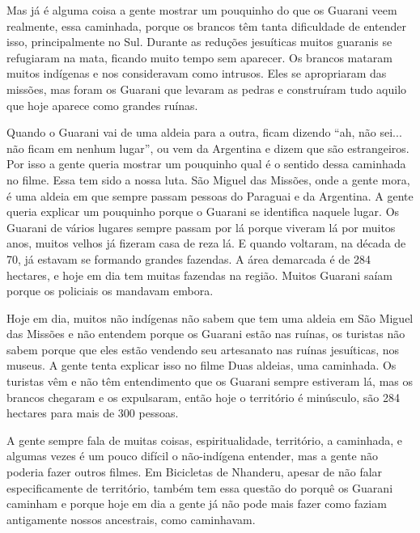 \documentclass{article}
\begin{document}
Mas j\'a \'e alguma coisa a gente mostrar um pouquinho do que os Guarani
veem realmente, essa caminhada, porque os brancos t\^em tanta
dificuldade de entender isso, principalmente no Sul. Durante as
redu\c{c}\~oes jesu\'iticas muitos guaranis se refugiaram na mata,
ficando muito tempo sem aparecer. Os brancos mataram muitos ind\'igenas
e nos consideravam como intrusos. Eles se apropriaram das miss\~oes,
mas foram os Guarani que levaram as pedras e constru\'iram tudo aquilo
que hoje aparece como grandes ru\'inas.

Quando o Guarani vai de uma aldeia para a outra, ficam dizendo
{\textquotedblleft}ah, n\~ao sei... n\~ao ficam em nenhum
lugar{\textquotedblright}, ou vem da Argentina e dizem que s\~ao
estrangeiros. Por isso a gente queria mostrar um pouquinho qual \'e o
sentido dessa caminhada no filme. Essa tem sido a nossa luta. S\~ao
Miguel das Miss\~oes, onde a gente mora, \'e uma aldeia em que sempre
passam pessoas do Paraguai e da Argentina. A gente queria explicar um
pouquinho porque o Guarani se identifica naquele lugar. Os Guarani de
v\'arios lugares sempre passam por l\'a porque viveram l\'a por muitos
anos, muitos velhos j\'a fizeram casa de reza l\'a. E quando voltaram,
na d\'ecada de 70, j\'a estavam se formando grandes fazendas. A \'area
demarcada \'e de 284 hectares, e hoje em dia tem muitas fazendas na
regi\~ao. Muitos Guarani sa\'iam porque os policiais os mandavam
embora.

Hoje em dia, muitos n\~ao ind\'igenas n\~ao sabem que tem uma aldeia em
S\~ao Miguel das Miss\~oes e n\~ao entendem porque os Guarani est\~ao
nas ru\'inas, os turistas n\~ao sabem porque que eles est\~ao vendendo
seu artesanato nas ru\'inas jesu\'iticas, nos museus. A gente tenta
explicar isso no filme Duas aldeias, uma caminhada. Os turistas v\^em e
n\~ao t\^em entendimento que os Guarani sempre estiveram l\'a, mas os
brancos chegaram e os expulsaram, ent\~ao hoje o territ\'orio \'e
min\'usculo, s\~ao 284 hectares para mais de 300 pessoas.

A gente sempre fala de muitas coisas, espiritualidade, territ\'orio, a
caminhada, e algumas vezes \'e um pouco dif\'icil o n\~ao-ind\'igena
entender, mas a gente n\~ao poderia fazer outros filmes. Em Bicicletas
de Nhanderu, apesar de n\~ao falar especificamente de territ\'orio,
tamb\'em tem essa quest\~ao do porqu\^e os Guarani caminham e porque
hoje em dia a gente j\'a n\~ao pode mais fazer como faziam antigamente
nossos ancestrais, como caminhavam.
\end{document}
